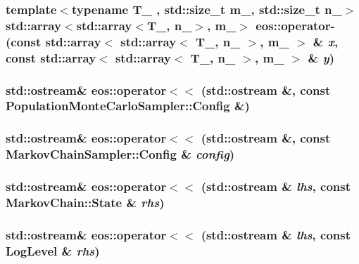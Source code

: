 \label{namespaceeos_aa8fefb77f2ab33ac602411123a62b956}
\hypertarget{namespaceeos_acbf11d2b07d36a4c4a3abb8d58bceea3}{
\subsubsection[{operator-\/}]{\setlength{\rightskip}{0pt plus 5cm}template$<$typename T\_\- , std::size\_\-t m\_\-, std::size\_\-t n\_\-$>$ std::array$<$std::array$<$T\_\-, n\_\-$>$, m\_\-$>$ eos::operator-\/ (const std::array$<$ std::array$<$ T\_\-, n\_\- $>$, m\_\- $>$ \& {\em x}, \/  const std::array$<$ std::array$<$ T\_\-, n\_\- $>$, m\_\- $>$ \& {\em y})}}
\label{namespaceeos_acbf11d2b07d36a4c4a3abb8d58bceea3}
\hypertarget{namespaceeos_ae82806395b35652601c81a77cdf89fae}{
\subsubsection[{operator$<$$<$}]{\setlength{\rightskip}{0pt plus 5cm}std::ostream\& eos::operator$<$$<$ (std::ostream \&, \/  const PopulationMonteCarloSampler::Config \&)}}
\label{namespaceeos_ae82806395b35652601c81a77cdf89fae}
\hypertarget{namespaceeos_a7642c201b3971d5a2d8e71b6d25cd339}{
\subsubsection[{operator$<$$<$}]{\setlength{\rightskip}{0pt plus 5cm}std::ostream\& eos::operator$<$$<$ (std::ostream \&, \/  const MarkovChainSampler::Config \& {\em config})}}
\label{namespaceeos_a7642c201b3971d5a2d8e71b6d25cd339}
\hypertarget{namespaceeos_a71b35e367b59b8fe16e6111d0851445f}{
\subsubsection[{operator$<$$<$}]{\setlength{\rightskip}{0pt plus 5cm}std::ostream\& eos::operator$<$$<$ (std::ostream \& {\em lhs}, \/  const MarkovChain::State \& {\em rhs})}}
\label{namespaceeos_a71b35e367b59b8fe16e6111d0851445f}
\hypertarget{namespaceeos_a397c7661ab7dbc53ad04d52cd371c8aa}{
\subsubsection[{operator$<$$<$}]{\setlength{\rightskip}{0pt plus 5cm}std::ostream\& eos::operator$<$$<$ (std::ostream \& {\em lhs}, \/  const LogLevel \& {\em rhs})}}
